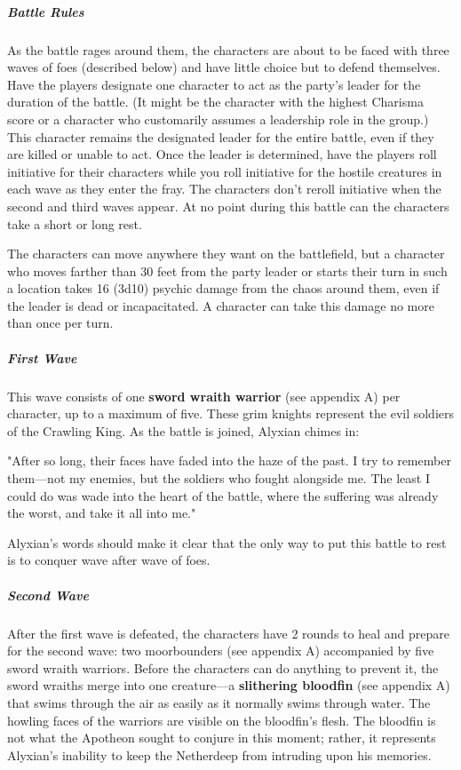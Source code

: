 \documentclass[10pt,a4paper,twoside,bg=print,twocolumn,openany,nodeprecatedcode]{dndbook}
\begin{document}
\subparagraph{Battle Rules}
As the battle rages around them, the characters are about to be faced with three waves of foes (described below) and have little choice but to defend themselves. Have the players designate one character to act as the party's leader for the duration of the battle. (It might be the character with the highest Charisma score or a character who customarily assumes a leadership role in the group.) This character remains the designated leader for the entire battle, even if they are killed or unable to act. Once the leader is determined, have the players roll initiative for their characters while you roll initiative for the hostile creatures in each wave as they enter the fray. The characters don't reroll initiative when the second and third waves appear. At no point during this battle can the characters take a short or long rest.

The characters can move anywhere they want on the battlefield, but a character who moves farther than 30 feet from the party leader or starts their turn in such a location takes 16 (3d10) psychic damage from the chaos around them, even if the leader is dead or incapacitated. A character can take this damage no more than once per turn.

\subparagraph{First Wave}
This wave consists of one \textbf{sword wraith warrior} (see appendix A) per character, up to a maximum of five. These grim knights represent the evil soldiers of the Crawling King. As the battle is joined, Alyxian chimes in:

\begin{DndReadAloud}{}
"After so long, their faces have faded into the haze of the past. I try to remember them—not my enemies, but the soldiers who fought alongside me. The least I could do was wade into the heart of the battle, where the suffering was already the worst, and take it all into me."

\end{DndReadAloud}

Alyxian's words should make it clear that the only way to put this battle to rest is to conquer wave after wave of foes.

\subparagraph{Second Wave}
After the first wave is defeated, the characters have 2 rounds to heal and prepare for the second wave: two moorbounders (see appendix A) accompanied by five sword wraith warriors. Before the characters can do anything to prevent it, the sword wraiths merge into one creature—a \textbf{slithering bloodfin} (see appendix A) that swims through the air as easily as it normally swims through water. The howling faces of the warriors are visible on the bloodfin's flesh. The bloodfin is not what the Apotheon sought to conjure in this moment; rather, it represents Alyxian's inability to keep the Netherdeep from intruding upon his memories.
\end{document}
